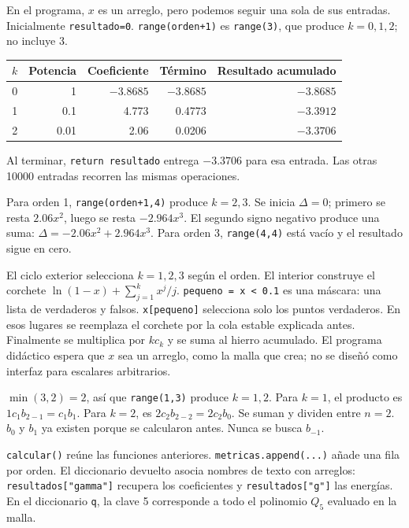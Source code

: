 En el programa, $x$ es un arreglo, pero podemos seguir una sola de sus entradas. Inicialmente \texttt{resultado=0}. \texttt{range(orden+1)} es \texttt{range(3)}, que produce $k=0,1,2$; no incluye 3.
\begin{center}\begin{tabular}{rrrrr}\toprule
$k$ & Potencia & Coeficiente & Término & Resultado acumulado\\\midrule
0 & 1 & $-3.8685$ & $-3.8685$ & $-3.8685$\\
1 & 0.1 & 4.773 & 0.4773 & $-3.3912$\\
2 & 0.01 & 2.06 & 0.0206 & $-3.3706$\\\bottomrule
\end{tabular}\end{center}
Al terminar, \texttt{return resultado} entrega $-3.3706$ para esa entrada. Las otras 10000 entradas recorren las mismas operaciones.

Para orden 1, \texttt{range(orden+1,4)} produce $k=2,3$. Se inicia $\Delta=0$; primero se resta $2.06x^2$, luego se resta $-2.964x^3$. El segundo signo negativo produce una suma: $\Delta=-2.06x^2+2.964x^3$. Para orden 3, \texttt{range(4,4)} está vacío y el resultado sigue en cero.

El ciclo exterior selecciona $k=1,2,3$ según el orden. El interior construye el corchete $\ln(1-x)+\sum_{j=1}^kx^j/j$. \texttt{pequeno = x < 0.1} es una máscara: una lista de verdaderos y falsos. \texttt{x[pequeno]} selecciona solo los puntos verdaderos. En esos lugares se reemplaza el corchete por la cola estable explicada antes. Finalmente se multiplica por $kc_k$ y se suma al hierro acumulado. El programa didáctico espera que $x$ sea un arreglo, como la malla que crea; no se diseñó como interfaz para escalares arbitrarios.

$\min(3,2)=2$, así que \texttt{range(1,3)} produce $k=1,2$. Para $k=1$, el producto es $1c_1b_{2-1}=c_1b_1$. Para $k=2$, es $2c_2b_{2-2}=2c_2b_0$. Se suman y dividen entre $n=2$. $b_0$ y $b_1$ ya existen porque se calcularon antes. Nunca se busca $b_{-1}$.

\texttt{calcular()} reúne las funciones anteriores. \texttt{metricas.append(...)} añade una fila por orden. El diccionario devuelto asocia nombres de texto con arreglos: \texttt{resultados["gamma"]} recupera los coeficientes y \texttt{resultados["g"]} las energías. En el diccionario \texttt{q}, la clave 5 corresponde a todo el polinomio $Q_5$ evaluado en la malla.


